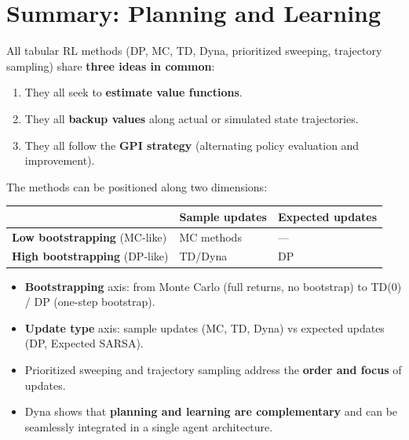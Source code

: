 \documentclass[11pt,a4paper]{article}
\theoremstyle{definition}
\theoremstyle{plain}
\theoremstyle{remark}
\begin{document}
\section{Summary: Planning and Learning}

\begin{tcolorbox}[colback=green!5!white, colframe=green!60!black, title={RL as a Coherent Set of Ideas}]
All tabular RL methods (DP, MC, TD, Dyna, prioritized sweeping, trajectory sampling) share \textbf{three ideas in common}:
\begin{enumerate}
    \item They all seek to \textbf{estimate value functions}.
    \item They all \textbf{backup values} along actual or simulated state trajectories.
    \item They all follow the \textbf{GPI strategy} (alternating policy evaluation and improvement).
\end{enumerate}
\end{tcolorbox}

The methods can be positioned along two dimensions:

\begin{center}
\begin{tabular}{lll}
\hline
 & \textbf{Sample updates} & \textbf{Expected updates} \\
\hline
\textbf{Low bootstrapping} (MC-like) & MC methods & --- \\
\textbf{High bootstrapping} (DP-like) & TD/Dyna & DP \\
\hline
\end{tabular}
\end{center}

\begin{itemize}
    \item \textbf{Bootstrapping} axis: from Monte Carlo (full returns, no bootstrap) to TD(0) / DP (one-step bootstrap).
    \item \textbf{Update type} axis: sample updates (MC, TD, Dyna) vs expected updates (DP, Expected SARSA).
    \item Prioritized sweeping and trajectory sampling address the \textbf{order and focus} of updates.
    \item Dyna shows that \textbf{planning and learning are complementary} and can be seamlessly integrated in a single agent architecture.
\end{itemize}
\end{document}
